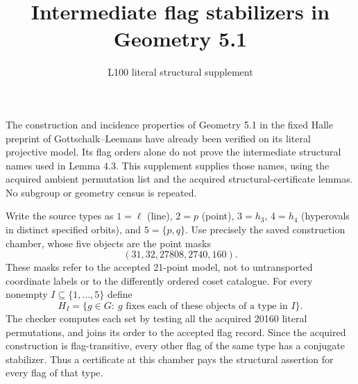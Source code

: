 \documentclass[11pt]{article}
\title{Intermediate flag stabilizers in Geometry 5.1}
\author{L100 literal structural supplement}\date{}
\begin{document}
\maketitle
The construction and incidence properties of Geometry 5.1 in the fixed
Halle preprint of Gottschalk--Leemans \cite{GL} have already been verified
on its literal projective model. Its flag orders alone do not prove the
intermediate structural names used in Lemma 4.3. This supplement supplies
those names, using the acquired ambient permutation list and the acquired
structural-certificate lemmas. No subgroup or geometry census is repeated.

Write the source types as $1=\ell$ (line), $2=p$ (point), $3=h_3$,
$4=h_4$ (hyperovals in distinct specified orbits), and $5=\{p,q\}$.
Use precisely the saved construction chamber, whose five objects are the
point masks
\[
 (31,32,27808,2740,160).
\]
These masks refer to the accepted 21-point model, not to untransported
coordinate labels or to the differently ordered coset catalogue.
For every nonempty $I\subseteq\{1,\ldots,5\}$ define
\[
 H_I=\{g\in G:\ g\text{ fixes each of these objects of a type in }I\}.
\]
The checker computes each set by testing all the acquired 20160 literal
permutations, and joins its order to the accepted flag record. Since the
acquired construction is flag-transitive, every other flag of the same
type has a conjugate stabilizer. Thus a certificate at this chamber pays
the structural assertion for every flag of that type.
\end{document}

